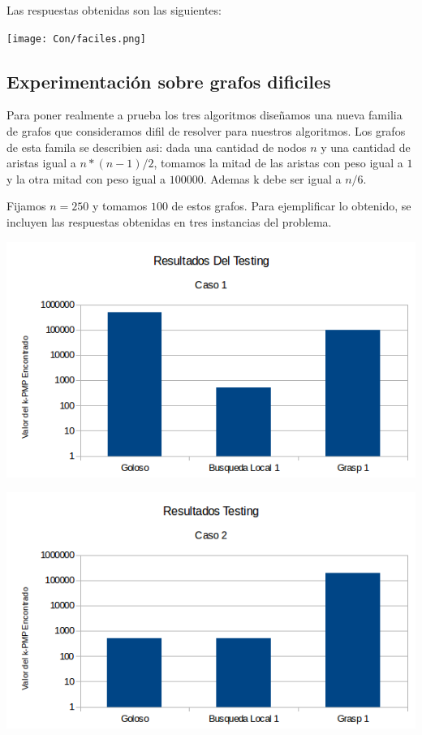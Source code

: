 Las respuestas obtenidas son las siguientes:

\texttt{[image: Con/faciles.png]}

\subsection{Experimentación sobre grafos dificiles}

Para poner realmente a prueba los tres algoritmos diseñamos una nueva familia de grafos que consideramos difil de resolver para nuestros algoritmos. Los grafos de esta famila se describien asi: dada una cantidad de nodos $n$ y una cantidad de aristas igual a $n*(n-1)/2$, tomamos la mitad de las aristas con peso igual a $1$ y la otra mitad con peso igual a $100000$. Ademas k debe ser igual a $n/6$.

Fijamos $n=250$ y tomamos $100$ de estos grafos. Para ejemplificar lo obtenido, se incluyen las respuestas obtenidas en tres instancias del problema.

\includegraphics[scale=0.5]{Con/dificil1.png}

\includegraphics[scale=0.5]{Con/dificil2.png}

